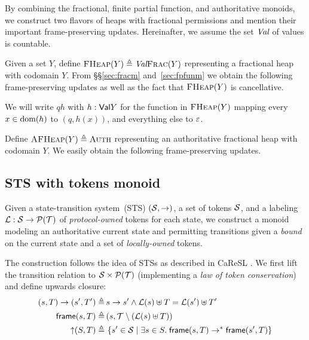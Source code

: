 By combining the fractional, finite partial function, and authoritative monoids, we construct two flavors of heaps with fractional permissions and mention their important frame-preserving updates.
Hereinafter, we assume the set $\textdom{Val}$ of values is countable.

Given a set $Y$, define $\FHeap(Y) \eqdef \textdom{Val} \fpfn \fracm(Y)$ representing a fractional heap with codomain $Y$.
From \S\S\ref{sec:fracm} and~\ref{sec:fpfunm} we obtain the following frame-preserving updates as well as the fact that $\FHeap(Y)$ is cancellative.
We will write $qh$ with $h : \textsort{Val} \fpfn Y$ for the function in $\FHeap(Y)$ mapping every $x \in \dom(h)$ to $(q, h(x))$, and everything else to $\munit$.

Define $\AFHeap(Y) \eqdef \auth{\FHeap(Y)}$ representing an authoritative fractional heap with codomain $Y$.
We easily obtain the following frame-preserving updates.

\subsection{STS with tokens monoid}
\label{sec:stsmon}


Given a state-transition system~(STS) $(\STSS, \ra)$, a set of tokens $\STSS$, and a labeling $\STSL: \STSS \ra \mathcal{P}(\STST)$ of \emph{protocol-owned} tokens for each state, we construct a monoid modeling an authoritative current state and permitting transitions given a \emph{bound} on the current state and a set of \emph{locally-owned} tokens.

The construction follows the idea of STSs as described in CaReSL \cite{caresl}.
We first lift the transition relation to $\STSS \times \mathcal{P}(\STST)$ (implementing a \emph{law of token conservation}) and define upwards closure:
\begin{align*}
 (s, T) \ra (s', T') \eqdef&\, s \ra s' \land \STSL(s) \uplus T = \STSL(s') \uplus T' \\
 \textsf{frame}(s, T) \eqdef&\, (s, \STST \setminus (\STSL(s) \uplus T)) \\
 \upclose(S, T) \eqdef&\, \setComp{ s' \in \STSS}{\exists s \in S.\; \textsf{frame}(s, T) \ststrans \textsf{frame}(s', T) }
\end{align*}

